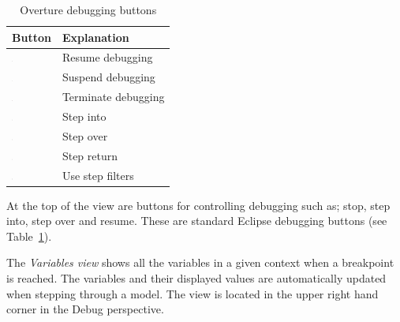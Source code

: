 {\begin{table}
\begin{center}
\begin{tabular}{|l|l|}\hline \hline
\textbf{Button} & \textbf{Explanation} \\ \hline
\includegraphics[width=0.03\textwidth]{figures/resume} & Resume debugging \\
\includegraphics[width=0.03\textwidth]{figures/suspend} & Suspend debugging\\
\includegraphics[width=0.03\textwidth]{figures/terminate} & Terminate debugging\\
\includegraphics[width=0.03\textwidth]{figures/stepinto} & Step into\\
\includegraphics[width=0.03\textwidth]{figures/stepover} & Step over \\
\includegraphics[width=0.03\textwidth]{figures/stepreturn} & Step return\\
\includegraphics[width=0.03\textwidth]{figures/stepbystep} & Use step filters\\
\hline \hline
\end{tabular}
\caption{Overture debugging buttons\label{tab:debugButtons}}
\end{center}
\end{table}

At the top of the view are buttons for controlling debugging such as;
stop, step into, step over and resume. These are standard Eclipse
debugging buttons (see Table~\ref{tab:debugButtons}).

The \emph{Variables view} shows all the variables in a given context
when a breakpoint is reached. The variables and their displayed values
are automatically updated when stepping through a model. The view is
located in the upper right hand corner in the Debug perspective.


}
